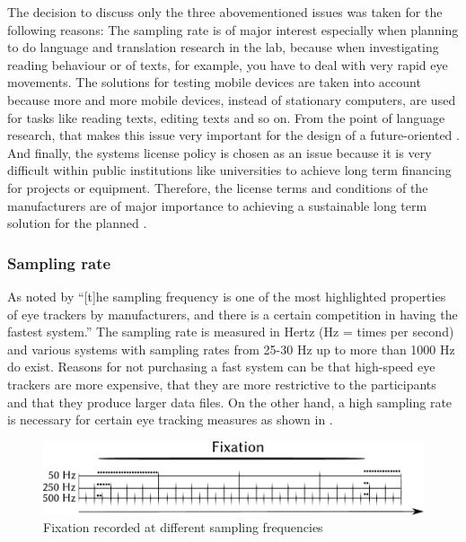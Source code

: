 \documentclass[output=paper]{langsci/langscibook}
\begin{document}
The decision to discuss only the three abovementioned issues was taken for the following reasons: The sampling rate is of major interest especially when planning to do language and translation research in the  lab, because when investigating reading behaviour or  of texts, for example, you have to deal with very rapid eye movements. The solutions for testing mobile devices are taken into account because more and more mobile devices, instead of stationary computers, are used for tasks like reading texts, editing texts and so on. From the point of language research, that makes this issue very important for the design of a future-oriented . And finally, the systems license policy is chosen as an issue because it is very difficult within public institutions like universities to achieve long term financing for projects or equipment. Therefore, the license terms and conditions of the manufacturers are of major importance to achieving a sustainable long term solution for the planned .


\subsubsection{Sampling rate}

As noted by \citet[29]{Holmqvist2011} ``[t]he sampling frequency is one of the most highlighted properties of eye trackers by manufacturers, and there is a certain competition in having the fastest system.'' The sampling rate is measured in Hertz (Hz = times per second) and various systems with sampling rates from 25-30 Hz up to more than 1000 Hz do exist. Reasons for not purchasing a fast system can be that high-speed eye trackers are more expensive, that they are more restrictive to the participants and that they produce larger data files. On the other hand, a high sampling rate is necessary for certain eye tracking measures as shown in .

\begin{figure}
 \includegraphics[width=\textwidth]{figures/Roesener4.pdf}
 \caption{Fixation recorded at different sampling frequencies \citep[31]{Holmqvist2011}}
 \label{roesener:fig:4}
\end{figure} 
\end{document}
